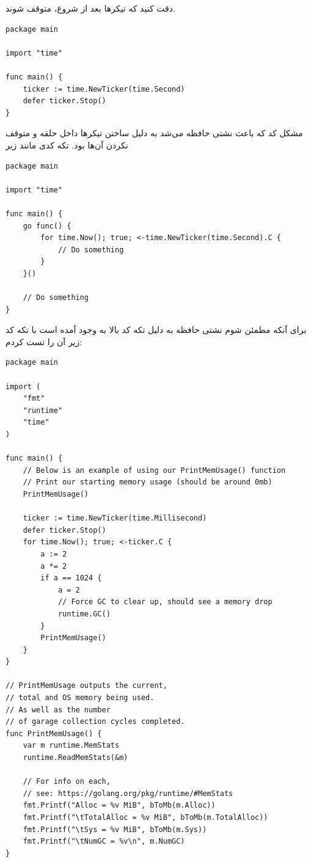 \documentclass[a4]{report}
\begin{document}
دقت کنید که تیکرها بعد از شروع، متوقف شوند.

\begin{latin}
\begin{verbatim}
package main

import "time"

func main() {
    ticker := time.NewTicker(time.Second)
    defer ticker.Stop()
}
\end{verbatim}
\end{latin}

مشکل کد که باعث نشتی حافظه می‌شد به دلیل ساختن تیکرها داخل حلقه و متوقف نکردن آن‌ها بود. تکه کدی مانند زیر


\begin{latin}
\begin{verbatim}
package main

import "time"

func main() {
    go func() {
        for time.Now(); true; <-time.NewTicker(time.Second).C {
            // Do something
        }
    }()

    // Do something
}
\end{verbatim}
\end{latin}

برای آنکه مطمئن شوم نشتی حافظه به دلیل تکه کد بالا به وجود آمده است با تکه کد زیر آن را تست کردم:

\begin{latin}
\begin{verbatim}
package main

import (
    "fmt"
    "runtime"
    "time"
)

func main() {
    // Below is an example of using our PrintMemUsage() function
    // Print our starting memory usage (should be around 0mb)
    PrintMemUsage()

    ticker := time.NewTicker(time.Millisecond)
    defer ticker.Stop()
    for time.Now(); true; <-ticker.C {
        a := 2
        a *= 2
        if a == 1024 {
            a = 2
            // Force GC to clear up, should see a memory drop
            runtime.GC()
        }
        PrintMemUsage()
    }
}

// PrintMemUsage outputs the current,
// total and OS memory being used.
// As well as the number
// of garage collection cycles completed.
func PrintMemUsage() {
    var m runtime.MemStats
    runtime.ReadMemStats(&m)

    // For info on each,
    // see: https://golang.org/pkg/runtime/#MemStats
    fmt.Printf("Alloc = %v MiB", bToMb(m.Alloc))
    fmt.Printf("\tTotalAlloc = %v MiB", bToMb(m.TotalAlloc))
    fmt.Printf("\tSys = %v MiB", bToMb(m.Sys))
    fmt.Printf("\tNumGC = %v\n", m.NumGC)
}
\end{verbatim}
\end{latin}
\end{document}
